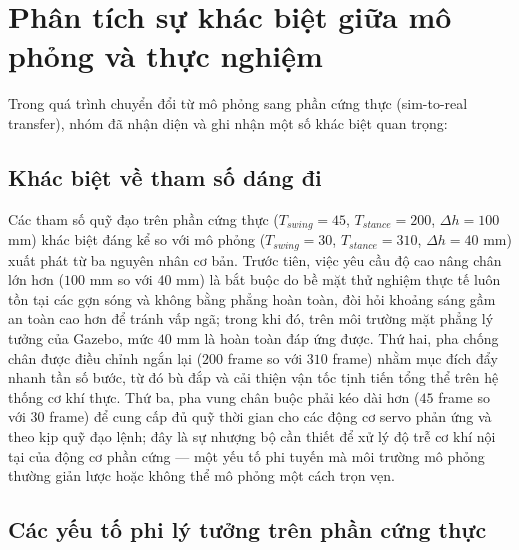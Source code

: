 \section{Phân tích sự khác biệt giữa mô phỏng và thực nghiệm}

Trong quá trình chuyển đổi từ mô phỏng sang phần cứng thực (sim-to-real transfer), nhóm đã nhận diện và ghi nhận một số khác biệt quan trọng:



\subsection{Khác biệt về tham số dáng đi}

Các tham số quỹ đạo trên phần cứng thực ($T_{swing} = 45$, $T_{stance} = 200$, $\Delta h = 100$ mm) khác biệt đáng kể so với mô phỏng ($T_{swing} = 30$, $T_{stance} = 310$, $\Delta h = 40$ mm) xuất phát từ ba nguyên nhân cơ bản. Trước tiên, việc yêu cầu độ cao nâng chân lớn hơn ($100$ mm so với $40$ mm) là bắt buộc do bề mặt thử nghiệm thực tế luôn tồn tại các gợn sóng và không bằng phẳng hoàn toàn, đòi hỏi khoảng sáng gầm an toàn cao hơn để tránh vấp ngã; trong khi đó, trên môi trường mặt phẳng lý tưởng của Gazebo, mức $40$ mm là hoàn toàn đáp ứng được. Thứ hai, pha chống chân được điều chỉnh ngắn lại ($200$ frame so với $310$ frame) nhằm mục đích đẩy nhanh tần số bước, từ đó bù đắp và cải thiện vận tốc tịnh tiến tổng thể trên hệ thống cơ khí thực. Thứ ba, pha vung chân buộc phải kéo dài hơn ($45$ frame so với $30$ frame) để cung cấp đủ quỹ thời gian cho các động cơ servo phản ứng và theo kịp quỹ đạo lệnh; đây là sự nhượng bộ cần thiết để xử lý độ trễ cơ khí nội tại của động cơ phần cứng — một yếu tố phi tuyến mà môi trường mô phỏng thường giản lược hoặc không thể mô phỏng một cách trọn vẹn.

\subsection{Các yếu tố phi lý tưởng trên phần cứng thực}

